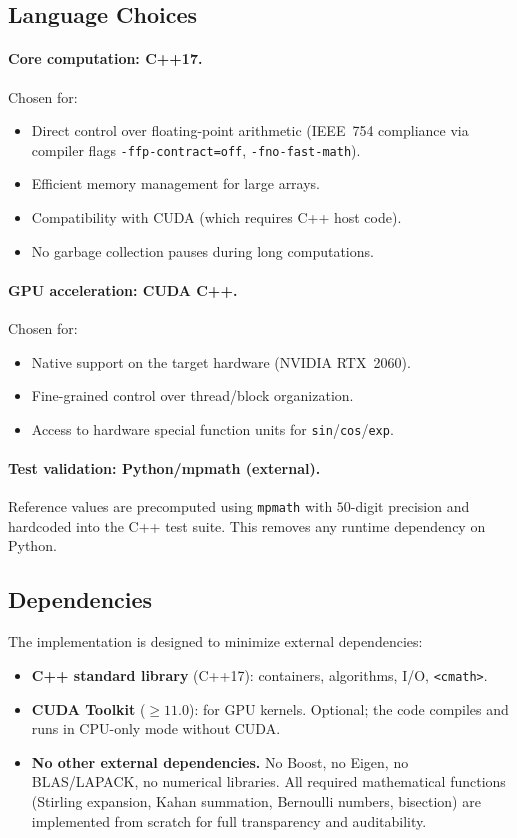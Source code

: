 \subsection{Language Choices}
\label{sec:languages}

\paragraph{Core computation: C++17.}
Chosen for:
\begin{itemize}
  \item Direct control over floating-point arithmetic (IEEE~754 compliance via compiler
        flags \texttt{-ffp-contract=off}, \texttt{-fno-fast-math}).
  \item Efficient memory management for large arrays.
  \item Compatibility with CUDA (which requires C++ host code).
  \item No garbage collection pauses during long computations.
\end{itemize}

\paragraph{GPU acceleration: CUDA C++.}
Chosen for:
\begin{itemize}
  \item Native support on the target hardware (NVIDIA RTX~2060).
  \item Fine-grained control over thread/block organization.
  \item Access to hardware special function units for \texttt{sin}/\texttt{cos}/\texttt{exp}.
\end{itemize}

\paragraph{Test validation: Python/mpmath (external).}
Reference values are precomputed using \texttt{mpmath} with $50$-digit precision and
hardcoded into the C++ test suite. This removes any runtime dependency on Python.


\subsection{Dependencies}
\label{sec:deps}

The implementation is designed to minimize external dependencies:
\begin{itemize}
  \item \textbf{C++ standard library} (C++17): containers, algorithms, I/O,
        \texttt{<cmath>}.
  \item \textbf{CUDA Toolkit} ($\ge 11.0$): for GPU kernels. Optional; the code compiles
        and runs in CPU-only mode without CUDA.
  \item \textbf{No other external dependencies.} No Boost, no Eigen, no BLAS/LAPACK, no
        numerical libraries. All required mathematical functions (Stirling expansion,
        Kahan summation, Bernoulli numbers, bisection) are implemented from scratch for
        full transparency and auditability.
\end{itemize}


